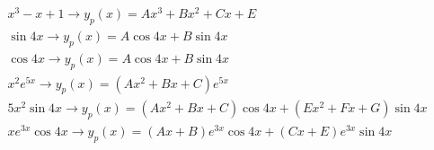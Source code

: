\documentclass[12pt]{article}
\begin{document}
\begin{equation}
  \begin{split}
x^3-x+1\rightarrow y_p(x)=Ax^3+Bx^2+Cx+E\\
\sin 4x \rightarrow y_p(x)=A\cos 4x + B\sin 4x\\
\cos 4x \rightarrow y_p(x)=A\cos 4x + B\sin 4x\\
x^2e^{5x}\rightarrow y_p(x)=(Ax^2+Bx+C)e^{5x}\\
5x^2\sin 4x \rightarrow y_p(x)=(Ax^2+Bx+C)\cos 4x + (Ex^2+Fx+G)\sin 4x\\
xe^{3x}\cos 4x\rightarrow y_p(x)=(Ax+B)e^{3x}\cos 4x + (Cx+E)e^{3x}\sin 4x
\end{split}
  \label{17}
\end{equation}

\vfill

\hline
\end{document}
